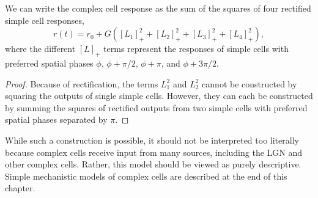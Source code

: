 \begin{prop}
  We can write the complex cell response as the sum of the squares of four rectified simple cell responses,
  \begin{equation}
    \label{equ:2.44}
    r(t)=r_0+G([L_1]_+^2+[L_2]_+^2+[L_3]_+^2+[L_4]_+^2),
  \end{equation}
  where the different $[L]_+$ terms represent the responses of simple cells with preferred spatial phases $\phi$, $\phi+\pi/2$, $\phi+\pi$, and $\phi+3\pi/2$.
\end{prop}
\begin{proof}
  Because of rectification, the terms $L_1^2$ and $L_2^2$ cannot be constructed by squaring the outputs of single simple cells. However, they can each be constructed by summing the squares of rectified outputs from two simple cells with preferred spatial phases separated by $\pi$.
\end{proof}

\begin{rem}
   While such a construction is possible, it should not be interpreted too literally because complex cells receive input from many sources, including the LGN and other complex cells. Rather, this model should be viewed as purely descriptive. Simple mechanistic models of complex cells are described at the end of this chapter.
\end{rem}




 





